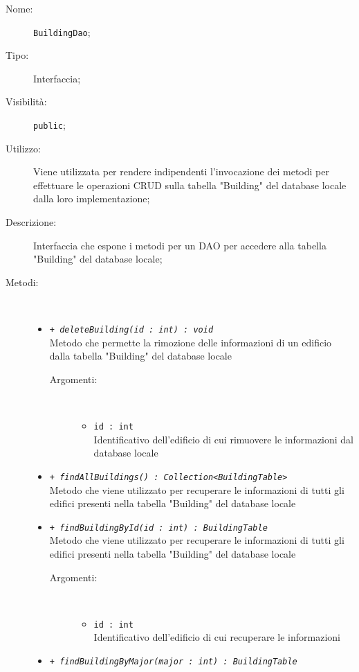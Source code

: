 \documentclass[../DefinizioneDiProdotto.tex]{subfiles}
\begin{document}
    \begin{description}
\item[Nome:] \texttt{BuildingDao};
\item[Tipo:] Interfaccia;
\item[Visibilità:] \texttt{public};
\item[Utilizzo:] Viene utilizzata per rendere indipendenti l'invocazione dei metodi per effettuare le operazioni CRUD sulla tabella "Building" del database locale dalla loro implementazione;
\item[Descrizione:] Interfaccia che espone i metodi per un DAO per accedere alla tabella "Building" del database locale;
\item[Metodi:] \
\begin{itemize}
\item \texttt{+ \textit{deleteBuilding(id : int) : void}}\\
Metodo che permette la rimozione delle informazioni di un edificio dalla tabella "Building" del database locale 
 \begin{description}
\item[Argomenti:] \
\begin{itemize}
\item \texttt{id : int}\\
Identificativo dell'edificio di cui rimuovere le informazioni dal database locale\end{itemize}
\end{description}
\item \texttt{+ \textit{findAllBuildings() : Collection<BuildingTable>}}\\
Metodo che viene utilizzato per recuperare le informazioni di tutti gli edifici presenti nella tabella "Building" del database locale
 \item \texttt{+ \textit{findBuildingById(id : int) : BuildingTable}}\\
Metodo che viene utilizzato per recuperare le informazioni di tutti gli edifici presenti nella tabella "Building" del database locale
 \begin{description}
\item[Argomenti:] \
\begin{itemize}
\item \texttt{id : int}\\
Identificativo dell'edificio di cui recuperare le informazioni\end{itemize}
\end{description}
\item \texttt{+ \textit{findBuildingByMajor(major : int) : BuildingTable}}\\

\end{itemize}
\end{description}
\end{document}
